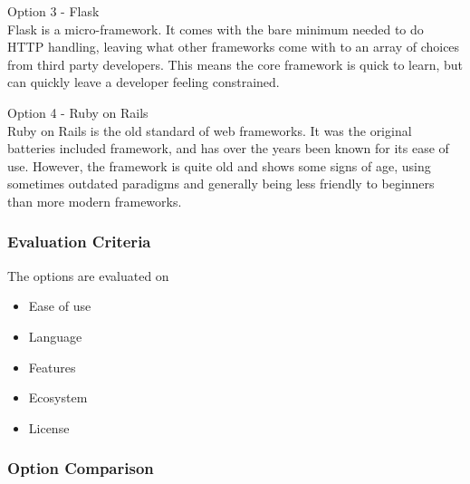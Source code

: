 \documentclass[onecolumn, draftclsnofoot,10pt, compsoc]{IEEEtran}
\begin{document}
{\medskip

\noindent Option 3 - Flask \\
\noindent Flask is a micro-framework. It comes with the bare minimum needed to do HTTP handling, leaving
what other frameworks come with to an array of choices from third party developers. This means the core
framework is quick to learn, but can quickly leave a developer feeling constrained.

\medskip

\noindent Option 4 - Ruby on Rails \\
\noindent Ruby on Rails is the old standard of web frameworks. It was the original batteries included
framework, and has over the years been known for its ease of use. However, the framework is quite old
and shows some signs of age, using sometimes outdated paradigms and generally being less friendly to beginners than more modern frameworks.

\medskip

\subsubsection{Evaluation Criteria}
{\noindent The options are evaluated on

\begin{itemize}
\item Ease of use
\item Language
\item Features
\item Ecosystem
\item License
\end{itemize}

 \par}


\newpage
\subsubsection{Option Comparison} ~\\

}
\end{document}
